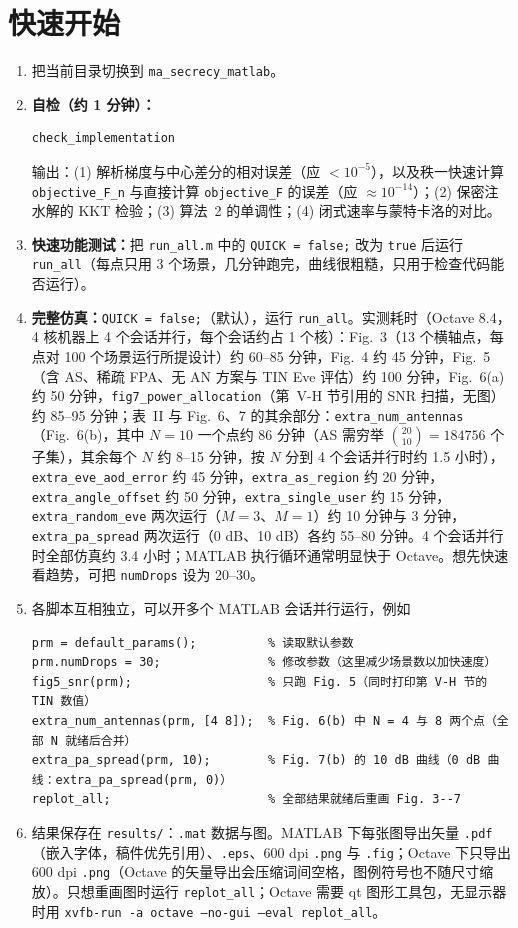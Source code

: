 \documentclass[11pt,a4paper]{ctexart}
\newcommand{\code}[1]{\texttt{#1}}
\begin{document}
\section{快速开始}
\begin{enumerate}
\item 把当前目录切换到 \code{ma\_secrecy\_matlab}。
\item \textbf{自检（约 1 分钟）：}
\begin{lstlisting}
check_implementation
\end{lstlisting}
输出：(1) 解析梯度与中心差分的相对误差（应 $<10^{-5}$），以及秩一快速计算 \code{objective\_F\_n} 与直接计算 \code{objective\_F} 的误差（应 $\approx10^{-14}$）；(2) 保密注水解的 KKT 检验；(3) 算法~2 的单调性；(4) 闭式速率与蒙特卡洛的对比。
\item \textbf{快速功能测试：}把 \code{run\_all.m} 中的 \code{QUICK = false;} 改为 \code{true} 后运行 \code{run\_all}（每点只用 3 个场景，几分钟跑完，曲线很粗糙，只用于检查代码能否运行）。
\item \textbf{完整仿真：}\code{QUICK = false;}（默认），运行 \code{run\_all}。实测耗时（Octave 8.4，4 核机器上 4 个会话并行，每个会话约占 1 个核）：Fig.~3（13 个横轴点，每点对 100 个场景运行所提设计）约 60--85 分钟，Fig.~4 约 45 分钟，Fig.~5（含 AS、稀疏 FPA、无 AN 方案与 TIN Eve 评估）约 100 分钟，Fig.~6(a) 约 50 分钟，\code{fig7\_power\_allocation}（第~V-H 节引用的 SNR 扫描，无图）约 85--95 分钟；表~II 与 Fig.~6、7 的其余部分：\code{extra\_num\_antennas}（Fig.~6(b)，其中 $N=10$ 一个点约 86 分钟（AS 需穷举 $\binom{20}{10}=184756$ 个子集），其余每个 $N$ 约 8--15 分钟，按 $N$ 分到 4 个会话并行时约 1.5 小时），\code{extra\_eve\_aod\_error} 约 45 分钟，\code{extra\_as\_region} 约 20 分钟，\code{extra\_angle\_offset} 约 50 分钟，\code{extra\_single\_user} 约 15 分钟，\code{extra\_random\_eve} 两次运行（$M=3$、$M=1$）约 10 分钟与 3 分钟，\code{extra\_pa\_spread} 两次运行（0 dB、10 dB）各约 55--80 分钟。4 个会话并行时全部仿真约 3.4 小时；MATLAB 执行循环通常明显快于 Octave。想先快速看趋势，可把 \code{numDrops} 设为 20--30。
\item 各脚本互相独立，可以开多个 MATLAB 会话并行运行，例如
\begin{lstlisting}
prm = default_params();          % 读取默认参数
prm.numDrops = 30;               % 修改参数（这里减少场景数以加快速度）
fig5_snr(prm);                   % 只跑 Fig. 5（同时打印第 V-H 节的 TIN 数值）
extra_num_antennas(prm, [4 8]);  % Fig. 6(b) 中 N = 4 与 8 两个点（全部 N 就绪后合并）
extra_pa_spread(prm, 10);        % Fig. 7(b) 的 10 dB 曲线（0 dB 曲线：extra_pa_spread(prm, 0)）
replot_all;                      % 全部结果就绪后重画 Fig. 3--7
\end{lstlisting}
\item 结果保存在 \code{results/}：\code{.mat} 数据与图。MATLAB 下每张图导出矢量 \code{.pdf}（嵌入字体，稿件优先引用）、\code{.eps}、600 dpi \code{.png} 与 \code{.fig}；Octave 下只导出 600 dpi \code{.png}（Octave 的矢量导出会压缩词间空格，图例符号也不随尺寸缩放）。只想重画图时运行 \code{replot\_all}；Octave 需要 qt 图形工具包，无显示器时用 \code{xvfb-run -a octave --no-gui --eval replot\_all}。
\end{enumerate}
\end{document}
